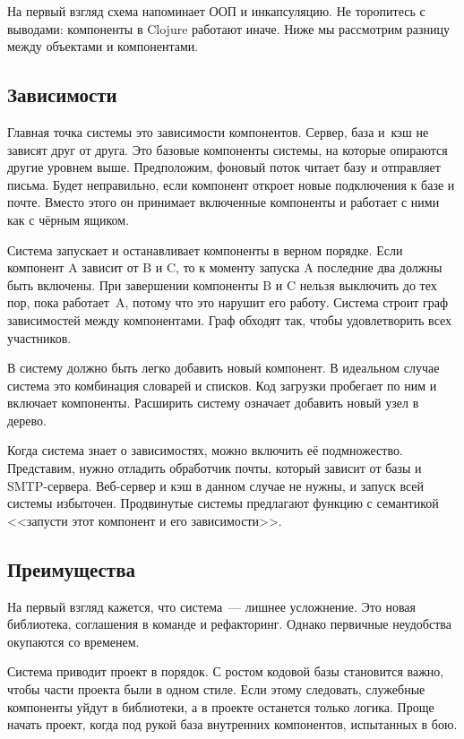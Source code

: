 На первый взгляд схема напоминает ООП и инкапсуляцию. Не торопитесь с выводами:
компоненты в Clojure работают иначе. Ниже мы рассмотрим разницу между объектами
и компонентами.

\subsection{Зависимости}

Главная точка системы это зависимости компонентов. Сервер, база и~кэш не зависят
друг от друга. Это базовые компоненты системы, на которые опираются другие
уровнем выше. Предположим, фоновый поток читает базу и отправляет письма. Будет
неправильно, если компонент откроет новые подключения к базе и почте. Вместо
этого он принимает включенные компоненты и работает с ними как с чёрным ящиком.

Система запускает и останавливает компоненты в верном порядке. Если компонент A
зависит от B и C, то к моменту запуска A последние два должны быть включены. При
завершении компоненты B и C нельзя выключить до тех пор, пока работает~A, потому
что это нарушит его работу. Система строит граф зависимостей между
компонентами. Граф обходят так, чтобы удовлетворить всех участников.

В систему должно быть легко добавить новый компонент. В идеальном случае система
это комбинация словарей и списков. Код загрузки пробегает по ним и включает
компоненты. Расширить систему означает добавить новый узел в дерево.

Когда система знает о зависимостях, можно включить её подмножество. Представим,
нужно отладить обработчик почты, который зависит от базы и
SMTP-сервера. Веб-сервер и кэш в данном случае не нужны, и запуск всей системы
избыточен. Продвинутые системы предлагают функцию с семантикой <<запусти этот
компонент и его зависимости>>.

\subsection{Преимущества}

На первый взгляд кажется, что система~--- лишнее усложнение. Это новая
библиотека, соглашения в команде и рефакторинг. Однако первичные неудобства
окупаются со временем.

Система приводит проект в порядок. С ростом кодовой базы становится важно, чтобы
части проекта были в одном стиле. Если этому следовать, служебные компоненты
уйдут в библиотеки, а в проекте останется только логика. Проще начать проект,
когда под рукой база внутренних компонентов, испытанных в бою.

